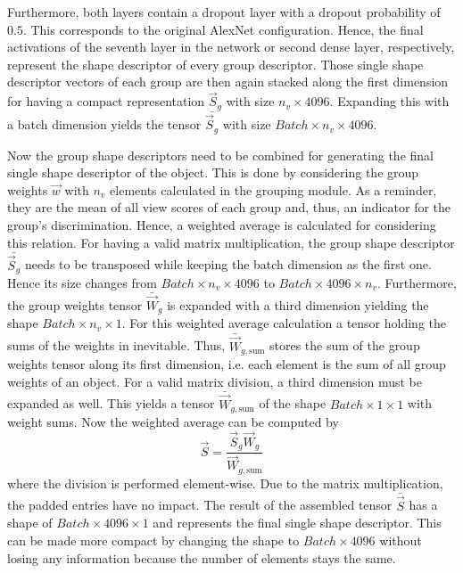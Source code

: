Furthermore, both layers contain a dropout layer with a dropout probability of $0.5$.
This corresponds to the original AlexNet configuration.
Hence, the final activations of the seventh layer in the network or second dense layer, respectively, represent the shape descriptor of every group descriptor.
Those single shape descriptor vectors of each group are then again stacked along the first dimension for having a compact representation $\vec{S}_g$ with size $n_v \times 4096$.
Expanding this with a batch dimension yields the tensor $\bar{\vec{S}_g}$ with size $Batch \times n_v \times 4096$.

Now the group shape descriptors need to be combined for generating the final single shape descriptor of the object.
This is done by considering the group weights $\vec{w}$ with $n_v$ elements calculated in the grouping module.
As a reminder, they are the mean of all view scores of each group and, thus, an indicator for the group's discrimination.
Hence, a weighted average is calculated for considering this relation.
For having a valid matrix multiplication, the group shape descriptor $\bar{\vec{S}_g}$ needs to be transposed while keeping the batch dimension as the first one.
Hence its size changes from $Batch \times n_v \times 4096$ to $Batch \times 4096 \times n_v$.
Furthermore, the group weights tensor $\bar{\vec{W}}_g$ is expanded with a third dimension yielding the shape $Batch \times n_v \times 1$.
For this weighted average calculation a tensor holding the sums of the weights in inevitable.
Thus, $\bar{\vec{W}}_{g,\text{sum}}$ stores the sum of the group weights tensor along its first dimension, i.e. each element is the sum of all group weights of an object.
For a valid matrix division, a third dimension must be expanded as well.
This yields a tensor $\bar{\vec{W}}_{g,\text{sum}}$ of the shape $Batch \times 1 \times 1$ with weight sums.
Now the weighted average can be computed by
\begin{equation}
	\vec{S} = \frac{\vec{S}_g \vec{W}_g} {\vec{W}_{g,\text{sum}}}
\end{equation}
where the division is performed element-wise.
Due to the matrix multiplication, the padded entries have no impact.
The result of the assembled tensor $\bar{\vec{S}}$ has a shape of $Batch \times 4096 \times 1$ and represents the final single shape descriptor.
This can be made more compact by changing the shape to $Batch \times 4096$ without losing any information because the number of elements stays the same.

